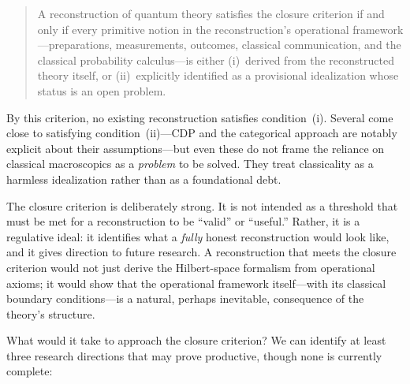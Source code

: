 \documentclass[pdflatex,sn-mathphys-num]{sn-jnl}%
\begin{document}
\begin{quote}
\noindent A reconstruction of quantum theory satisfies the closure criterion if and only if every primitive notion in the reconstruction's operational framework---preparations, measurements, outcomes, classical communication, and the classical probability calculus---is either (i)~derived from the reconstructed theory itself, or (ii)~explicitly identified as a provisional idealization whose status is an open problem.
\end{quote}

By this criterion, no existing reconstruction satisfies condition~(i). Several come close to satisfying condition~(ii)---CDP and the categorical approach are notably explicit about their assumptions---but even these do not frame the reliance on classical macroscopics as a \emph{problem} to be solved. They treat classicality as a harmless idealization rather than as a foundational debt.

The closure criterion is deliberately strong. It is not intended as a threshold that must be met for a reconstruction to be ``valid'' or ``useful.'' Rather, it is a regulative ideal: it identifies what a \emph{fully} honest reconstruction would look like, and it gives direction to future research. A reconstruction that meets the closure criterion would not just derive the Hilbert-space formalism from operational axioms; it would show that the operational framework itself---with its classical boundary conditions---is a natural, perhaps inevitable, consequence of the theory's structure.

What would it take to approach the closure criterion? We can identify at least three research directions that may prove productive, though none is currently complete:
\end{document}
